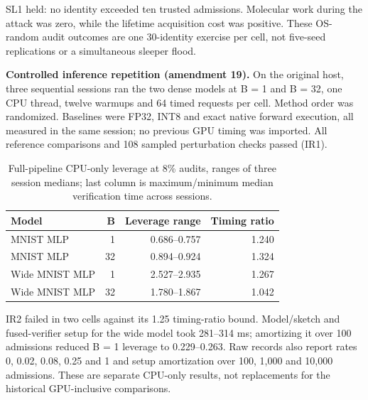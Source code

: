 \documentclass[11pt]{article}
\newcommand{\botrule}{\bottomrule}
\begin{document}
SL1 held: no identity exceeded ten trusted admissions. Molecular work during the attack was zero, while the lifetime acquisition cost was positive. These OS-random audit outcomes are one 30-identity exercise per cell, not five-seed replications or a simultaneous sleeper flood.

\textbf{Controlled inference repetition (amendment 19).} On the original host, three sequential sessions ran the two dense models at B = 1 and B = 32, one CPU thread, twelve warmups and 64 timed requests per cell. Method order was randomized. Baselines were FP32, INT8 and exact native forward execution, all measured in the same session; no previous GPU timing was imported. All reference comparisons and 108 sampled perturbation checks passed (IR1).

\begin{table}[htbp]
\caption{Full-pipeline CPU-only leverage at 8\% audits, ranges of three session medians; last column is maximum/minimum median verification time across sessions.}
\centering
\small
\begin{tabularx}{\textwidth}{Xrrr}
\toprule
Model & B & Leverage range & Timing ratio \\
\midrule
MNIST MLP & 1 & 0.686--0.757 & 1.240 \\
MNIST MLP & 32 & 0.894--0.924 & 1.324 \\
Wide MNIST MLP & 1 & 2.527--2.935 & 1.267 \\
Wide MNIST MLP & 32 & 1.780--1.867 & 1.042 \\
\botrule
\end{tabularx}
\end{table}

IR2 failed in two cells against its 1.25 timing-ratio bound. Model/sketch and fused-verifier setup for the wide model took 281--314 ms; amortizing it over 100 admissions reduced B = 1 leverage to 0.229--0.263. Raw records also report rates 0, 0.02, 0.08, 0.25 and 1 and setup amortization over 100, 1,000 and 10,000 admissions. These are separate CPU-only results, not replacements for the historical GPU-inclusive comparisons.
\end{document}
